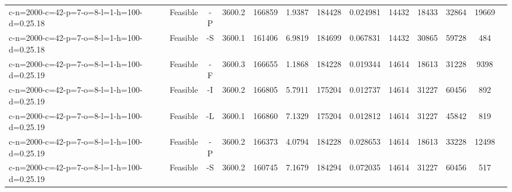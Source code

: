 \documentclass[landscape, a4paper]{article}
\begin{document}
\begin{center}
\begin{tabular}{lcccccccccccc}
c-n=2000-c=42-p=7-o=8-l=1-h=100-d=0.25.18 & Feasible & -P & 3600.2 & 166859 & 1.9387 & 184428 & 0.024981 & 14432 & 18433 & 32864 & 19669 & \\
c-n=2000-c=42-p=7-o=8-l=1-h=100-d=0.25.18 & Feasible & -S & 3600.1 & 161406 & 6.9819 & 184699 & 0.067831 & 14432 & 30865 & 59728 & 484 & \\
c-n=2000-c=42-p=7-o=8-l=1-h=100-d=0.25.19 & Feasible & -F & 3600.3 & 166655 & 1.1868 & 184228 & 0.019344 & 14614 & 18613 & 31228 & 9398 & \\
c-n=2000-c=42-p=7-o=8-l=1-h=100-d=0.25.19 & Feasible & -I & 3600.2 & 166805 & 5.7911 & 175204 & 0.012737 & 14614 & 31227 & 60456 & 892 & \\
c-n=2000-c=42-p=7-o=8-l=1-h=100-d=0.25.19 & Feasible & -L & 3600.1 & 166860 & 7.1329 & 175204 & 0.012812 & 14614 & 31227 & 45842 & 819 & \\
c-n=2000-c=42-p=7-o=8-l=1-h=100-d=0.25.19 & Feasible & -P & 3600.2 & 166373 & 4.0794 & 184228 & 0.028653 & 14614 & 18613 & 33228 & 12498 & \\
c-n=2000-c=42-p=7-o=8-l=1-h=100-d=0.25.19 & Feasible & -S & 3600.2 & 160745 & 7.1679 & 184294 & 0.072035 & 14614 & 31227 & 60456 & 517 & \\
\end{tabular}
\end{center}
\end{document}
